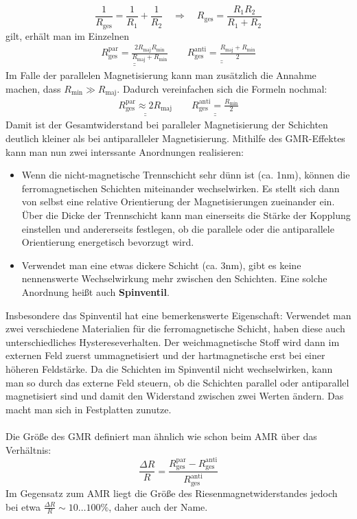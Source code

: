 \documentclass[german,  %
parskip=full,  %
]{scrartcl}
\begin{document}
\[\frac{1}{R_{\mathrm{ges}}} = \frac{1}{R_1} + \frac{1}{R_2} \quad\Longrightarrow\quad R_{\mathrm{ges}} = \frac{R_1 R_2}{R_1 + R_2}\]
gilt, erhält man im Einzelnen
\begin{align*}
\underline{\underline{R_{\mathrm{ges}}^{\mathrm{par}} = \frac{2R_{\mathrm{maj}} R_{\mathrm{min}}}{R_{\mathrm{maj}} + R_{\mathrm{min}}}  }} \quad\quad \underline{\underline{R_{\mathrm{ges}}^{\mathrm{anti}} = \frac{R_{\mathrm{maj}} + R_{\mathrm{min}}}{2}   }}
\end{align*}
Im Falle der parallelen Magnetisierung kann man zusätzlich die Annahme machen, dass \(R_{\mathrm{min}} \gg R_{\mathrm{maj}}\). Dadurch vereinfachen sich die Formeln nochmal:
\begin{align*}
\underline{\underline{R_{\mathrm{ges}}^{\mathrm{par}}  \approx 2R_{\mathrm{maj}} }} \quad\quad \underline{\underline{R_{\mathrm{ges}}^{\mathrm{anti}} = \frac{R_{\mathrm{min}}}{2}}  }
\end{align*}
Damit ist der Gesamtwiderstand bei paralleler Magnetisierung der Schichten deutlich kleiner als bei antiparalleler Magnetisierung. Mithilfe des GMR-Effektes kann man nun zwei interssante Anordnungen realisieren:
\begin{itemize}
\item Wenn die nicht-magnetische Trennschicht sehr dünn ist (ca. 1nm), können die ferromagnetischen Schichten miteinander wechselwirken. Es stellt sich dann von selbst eine relative Orientierung der Magnetisierungen zueinander ein. Über die Dicke der Trennschicht kann man einerseits die Stärke der Kopplung einstellen und andererseits festlegen, ob die parallele oder die antiparallele Orientierung energetisch bevorzugt wird. 
\item Verwendet man eine etwas dickere Schicht (ca. 3nm), gibt es keine nennenswerte Wechselwirkung mehr zwischen den Schichten. Eine solche Anordnung heißt auch \textbf{Spinventil}.
\end{itemize}
Insbesondere das Spinventil hat eine bemerkenswerte Eigenschaft: Verwendet man zwei verschiedene Materialien für die ferromagnetische Schicht, haben diese auch unterschiedliches Hystereseverhalten. Der weichmagnetische Stoff wird dann im externen Feld zuerst ummagnetisiert und der hartmagnetische erst bei einer höheren Feldstärke. Da die Schichten im Spinventil nicht wechselwirken, kann man so durch das externe Feld steuern, ob die Schichten parallel oder antiparallel magnetisiert sind und damit den Widerstand zwischen zwei Werten ändern. Das macht man sich in Festplatten zunutze. \\\\
Die Größe des GMR definiert man ähnlich wie schon beim AMR über das Verhältnis:
\[\frac{\Delta R}{R} = \frac{R_{\mathrm{ges}}^{\mathrm{par}} - R_{\mathrm{ges}}^{\mathrm{anti}}}{R_{\mathrm{ges}}^{\mathrm{anti}}}\]
Im Gegensatz zum AMR liegt die Größe des Riesenmagnetwiderstandes jedoch bei etwa \(\frac{\Delta R}{R}\sim 10\hdots 100\%\), daher auch der Name.
\end{document}

